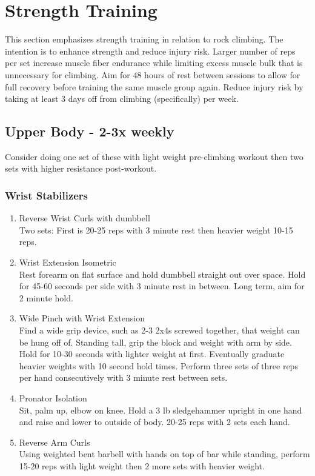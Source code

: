 \documentclass[12pt, letterpaper]{article}
\begin{document}
\newpage %


\section{Strength Training}

This section emphasizes strength training in relation to rock climbing.
The intention is to enhance strength and reduce injury risk. Larger number
of reps per set increase muscle fiber endurance while limiting excess 
muscle bulk that is unnecessary for climbing. Aim for 48 hours of rest 
between sessions to allow for full recovery before training the same muscle
 group again. Reduce injury risk by taking at least 3 days off from climbing 
 (specifically) per week.

\subsection{Upper Body - 2-3x weekly}

Consider doing one set of these with light weight pre-climbing workout then two sets with higher resistance post-workout.

\subsubsection{Wrist Stabilizers}

\begin{enumerate}
    \item Reverse Wrist Curls with dumbbell \\ 
          Two sets: First is 20-25 reps with 3 minute rest then heavier weight 10-15 reps.
    \item Wrist Extension Isometric \\ 
          Rest forearm on flat surface and hold dumbbell straight out over space. Hold for 
          45-60 seconds per side with 3 minute rest in between. Long term, aim for 2 minute hold.
    \item Wide Pinch with Wrist Extension \\ 
          Find a wide grip device, such as 2-3 2x4s screwed together, that weight can be hung 
          off of. Standing tall, grip the block and weight with arm by side. Hold for 
          10-30 seconds with lighter weight at first. Eventually graduate heavier weights 
          with 10 second hold times. Perform three sets of three reps per hand consecutively 
          with 3 minute rest between sets.
    \item Pronator Isolation \\ 
          Sit, palm up, elbow on knee. Hold a 3 lb sledgehammer upright in one hand and raise and 
          lower to outside of body. 20-25 reps with 2 sets each hand.
    \item Reverse Arm Curls \\ 
          Using weighted bent barbell with hands on top of bar while standing, perform 15-20 reps 
          with light weight then 2 more sets with heavier weight.
\end{enumerate}
\end{document}
